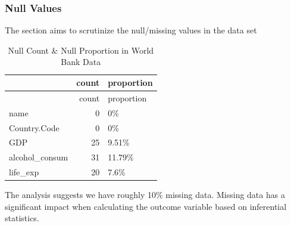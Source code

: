 \documentclass[
]{article}
\newenvironment{Shaded}{\begin{snugshade}}{\end{snugshade}}
\newcommand{\CommentTok}[1]{\textcolor[rgb]{0.54,0.53,0.53}{#1}}
\newcommand{\DataTypeTok}[1]{\textcolor[rgb]{0.00,0.34,0.68}{#1}}
\newcommand{\DecValTok}[1]{\textcolor[rgb]{0.69,0.50,0.00}{#1}}
\newcommand{\KeywordTok}[1]{\textcolor[rgb]{0.12,0.11,0.11}{\textbf{#1}}}
\newcommand{\NormalTok}[1]{\textcolor[rgb]{0.12,0.11,0.11}{#1}}
\newcommand{\OperatorTok}[1]{\textcolor[rgb]{0.12,0.11,0.11}{#1}}
\newcommand{\StringTok}[1]{\textcolor[rgb]{0.75,0.01,0.01}{#1}}
\begin{document}
\hypertarget{null-values}{%
\subsubsection{Null Values}\label{null-values}}

The section aims to scrutinize the null/missing values in the data set

\begin{Shaded}
\end{Shaded}

\begin{longtable}[]{@{}lrl@{}}
\caption{Null Count \& Null Proportion in World Bank
Data}\tabularnewline
\toprule
& count & proportion\tabularnewline
\midrule
\endfirsthead
\toprule
& count & proportion\tabularnewline
\midrule
\endhead
name & 0 & 0\%\tabularnewline
Country.Code & 0 & 0\%\tabularnewline
GDP & 25 & 9.51\%\tabularnewline
alcohol\_consum & 31 & 11.79\%\tabularnewline
life\_exp & 20 & 7.6\%\tabularnewline
\bottomrule
\end{longtable}

The analysis suggests we have roughly 10\% missing data. Missing data
has a significant impact when calculating the outcome variable based on
inferential statistics.
\end{document}
